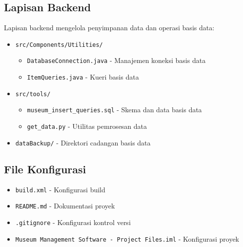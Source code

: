\documentclass[12pt,a4paper]{article}
\begin{document}
\subsection{Lapisan Backend}
Lapisan backend mengelola penyimpanan data dan operasi basis data:

\begin{itemize}
    \item \texttt{src/Components/Utilities/}
    \begin{itemize}
        \item \texttt{DatabaseConnection.java} - Manajemen koneksi basis data
        \item \texttt{ItemQueries.java} - Kueri basis data
    \end{itemize}
    
    \item \texttt{src/tools/}
    \begin{itemize}
        \item \texttt{museum\_insert\_queries.sql} - Skema dan data basis data
        \item \texttt{get\_data.py} - Utilitas pemrosesan data
    \end{itemize}
    
    \item \texttt{dataBackup/} - Direktori cadangan basis data
\end{itemize}

\subsection{File Konfigurasi}
\begin{itemize}
    \item \texttt{build.xml} - Konfigurasi build
    \item \texttt{README.md} - Dokumentasi proyek
    \item \texttt{.gitignore} - Konfigurasi kontrol versi
    \item \texttt{Museum Management Software - Project Files.iml} - Konfigurasi proyek
\end{itemize}
\end{document}
